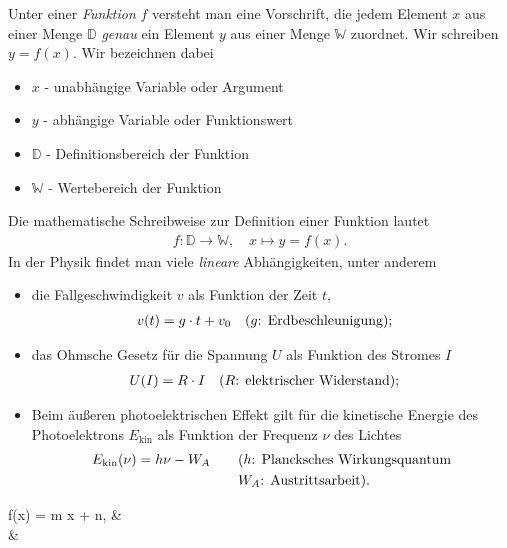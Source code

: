 Unter einer \emph{Funktion} $f$ versteht man eine Vorschrift, die jedem Element $x$ aus einer Menge $\mathbb{D}$ \emph{genau} ein Element $y$ aus einer Menge $\mathbb{W}$ zuordnet. Wir schreiben $y = f(x)$. Wir bezeichnen dabei 
\begin{itemize}
    \item $x$ - unabhängige Variable oder Argument 
    \item $y$ - abhängige Variable oder Funktionswert 
    \item $\mathbb{D}$ - Definitionsbereich der Funktion 
    \item $\mathbb{W}$ - Wertebereich der Funktion
\end{itemize}
Die mathematische Schreibweise zur Definition einer Funktion lautet 
\begin{align}
        f: \mathbb{D} \to \mathbb{W}, \quad x \mapsto y = f(x).
\end{align}
In der Physik findet man viele \emph{lineare} Abhängigkeiten, unter anderem 
\begin{itemize}
    \item die Fallgeschwindigkeit $v$ als Funktion der Zeit $t$,
    \begin{align}
            v(t) = g \cdot t + v_0 \qq{($g$: Erdbeschleunigung);}
    \end{align}
    \item das Ohmsche Gesetz für die Spannung $U$ als Funktion des Stromes $I$ 
    \begin{align}
            U(I) = R\cdot I \qq{($R$: elektrischer Widerstand);} 
    \end{align}
    \item Beim äußeren photoelektrischen Effekt gilt für die kinetische Energie des Photoelektrons $E_\text{kin}$ als Funktion der Frequenz $\nu$ des Lichtes 
    \begin{align}
            E_\text{kin}(\nu) = h \nu - W_A \qquad &\text{($h$: Plancksches Wirkungsquantum} \\
            &\text{$W_A$: Austrittsarbeit).} \notag
    \end{align}
\end{itemize}
\begin{mymathbox}[ams align, title={Allgemeine Form: lineare Funktion}, colframe={FSUblau}] \label{eqn:2_lineare_Funktion_Normalform}
    f(x) = m x + n,  \qquad & \\
    & \notag
\end{mymathbox}

